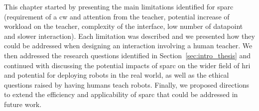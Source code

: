 This chapter started by presenting the main limitations identified for \gls{sparc} (requirement of a \gls{cw} and attention from the teacher, potential increase of workload on the teacher, complexity of the interface, low number of datapoint and slower interaction). Each limitation was described and we presented how they could be addressed when designing an interaction involving a human teacher. We then addressed the research questions identified in Section~\ref{sec:intro_thesis} and continued with discussing the potential impacts of \gls{sparc} on the wider field of \gls{hri} and potential for deploying robots in the real world, as well as the ethical questions raised by having humans teach robots. Finally, we proposed directions to extend the efficiency and applicability of \gls{sparc} that could be addressed in future work.

